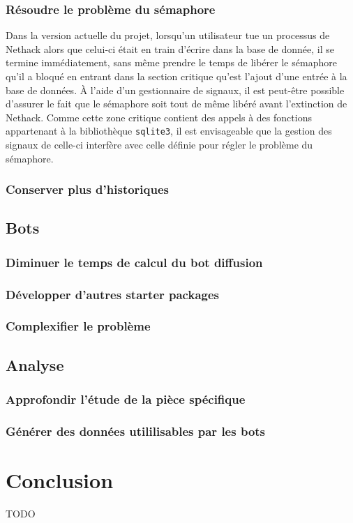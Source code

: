 \documentclass[a4paper,12pt]{article}
\begin{document}
\subsubsection{Résoudre le problème du sémaphore}
Dans la version actuelle du projet, lorsqu'un utilisateur tue un processus de
Nethack alors que celui-ci était en train d'écrire dans la base de donnée, il se
termine immédiatement, sans même prendre le temps de libérer le sémaphore qu'il
a bloqué en entrant dans la section critique qu'est l'ajout d'une entrée à la
base de données. À l'aide d'un gestionnaire de signaux, il est peut-être
possible d'assurer le fait que le sémaphore soit tout de même libéré avant
l'extinction de Nethack. Comme cette zone critique contient des appels à des
fonctions appartenant à la bibliothèque {\verb|sqlite3|}, il est envisageable
que la gestion des signaux de celle-ci interfère avec celle définie pour régler
le problème du sémaphore.

\subsubsection{Conserver plus d'historiques}
\subsection{Bots}
\subsubsection{Diminuer le temps de calcul du bot diffusion}
\subsubsection{Développer d'autres starter packages}
\subsubsection{Complexifier le problème}
\subsection{Analyse}
\subsubsection{Approfondir l'étude de la pièce spécifique}
\subsubsection{Générer des données utililisables par les bots}


\section{Conclusion}
TODO
\end{document}
